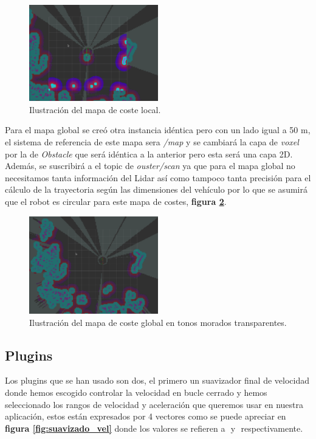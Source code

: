 \begin{figure}[H]
    \centering
    \includegraphics[width=0.5\textwidth]{images/mapa_coste_local.png}
    \caption{Ilustración del mapa de coste local.}
    \label{fig:mapa_local}
\end{figure}

Para el mapa global se creó otra instancia idéntica pero con un lado igual a 50 m, el sistema de referencia de este mapa sera \textit{/map} y se cambiará 
la capa de \textit{voxel} por la de \textit{Obstacle} que será idéntica a la anterior pero esta será una capa 2D. Además, se 
suscribirá a el topic de \textit{ouster/scan} ya que para el mapa global no necesitamos tanta información del Lidar así como tampoco tanta precisión para el 
cálculo de la trayectoria según las dimensiones del vehículo por lo que se asumirá que el robot es circular para este mapa de costes, \textbf{figura \ref{fig:mapa_global}}.

\begin{figure}[H]
    \centering
    \includegraphics[width=0.5\textwidth]{images/mapa_coste_global.png}
    \caption{Ilustración del mapa de coste global en tonos morados transparentes.}
    \label{fig:mapa_global}
\end{figure}

\subsection{Plugins}
Los plugins que se han usado son dos, el primero un suavizador final de velocidad donde hemos escogido controlar la velocidad en bucle cerrado y 
hemos seleccionado los rangos de velocidad y aceleración que queremos usar en nuestra aplicación, estos están expresados por 4 vectores como se 
puede apreciar en \textbf{figura \ref{fig:suavizado_vel}} donde los valores se refieren a \begin{math}[\dot{X},\dot{Y},\dot{\theta_{z}}]\end{math} 
 y \begin{math}[\ddot{X}, \ddot{Y}, \ddot{\theta_{z}}] \end{math} respectivamente.

